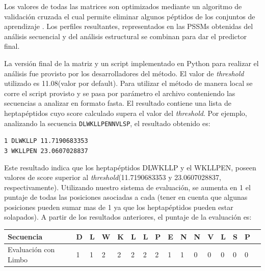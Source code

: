 Los valores de todas las matrices son optimizados mediante un algoritmo de validación cruzada el cual permite eliminar algunos péptidos de los conjuntos de aprendizaje .
Los perfiles resultantes, representados en las PSSMs obtenidas del análisis secuencial y del análisis estructural se combinan para dar el predictor final. 

La versión final de la matriz y un script implementado en Python para realizar el análisis fue provisto por los desarrolladores del método.
El valor de \textit{threshold} utilizado es 11.08(valor por default). Para utilizar el método de manera local se corre el script provisto y se pasa por parámetro el archivo conteniendo las secuencias a analizar en formato fasta.
El resultado contiene una lista de heptapéptidos cuyo score calculado supera el valor del \textit{threshold}.
Por ejemplo, analizando la secuencia \texttt{DLWKLLPENNVLSP}, el resultado obtenido es:

\noindent
\texttt{1 DLWKLLP 11.7190683353}   \\
\texttt{3 WKLLPEN 23.0607028837} 

Este resultado indica que los heptapéptidos DLWKLLP y el WKLLPEN, poseen valores de score superior al \textit{threshold}(11.7190683353 y 23.0607028837, respectivamente).
Utilizando nuestro sistema de evaluación, se aumenta en 1 el puntaje de todas las posiciones asociadas a cada (tener en cuenta que algunas posiciones pueden sumar mas de 1 ya que los heptapéptidos pueden estar solapados).
A partir de los resultados anteriores, el puntaje de la evaluación es:

\vspace{0.5cm}
\noindent
\begin{tabular}{llllllllllllllll} 
\hline      		
Secuencia & \textbf{D} & \textbf{L} & \textbf{W} & \textbf{K} & \textbf{L} & \textbf{L} & \textbf{P} & \textbf{E} & \textbf{N} & \textbf{N} & \textbf{V} & \textbf{L} & \textbf{S} & \textbf{P} \\ \hline
Evaluación con Limbo & 1 & 1 & 2 & 2 & 2 & 2 & 2 & 1 & 1 & 0 & 0 & 0 & 0 & 0 \\ \hline
\end{tabular}







